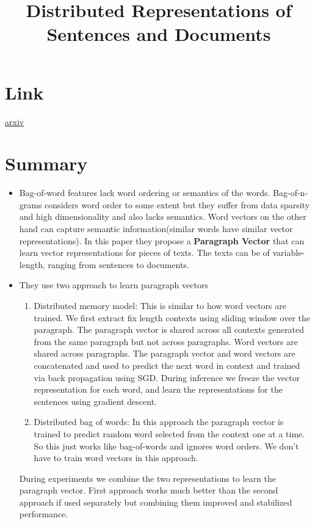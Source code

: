 \documentclass{article}
\title{Distributed Representations of Sentences and Documents}
\author{}
\date{}
\begin{document}
\maketitle

\section*{Link}
\href{https://arxiv.org/abs/1405.4053}{arxiv} 

\section*{Summary}
\begin{itemize}
    \item Bag-of-word features lack word ordering or semantics of the words. Bag-of-n-grams considers word order to some extent but they suffer from data sparsity and high dimensionality and also lacks semantics. Word vectors on the other hand can capture semantic information(similar words have similar vector representations). In this paper they propose a \textbf{Paragraph Vector} that can learn vector representations for pieces of texts. The texts can be of variable-length, ranging from sentences to documents.
    \item They use two approach to learn paragraph vectors
    \begin{enumerate}
        \item Distributed memory model: This is similar to how word vectors are trained. We first extract fix length contexts using sliding window over the paragraph. The paragraph vector is shared across all contexts generated from the same paragraph but not across paragraphs. Word vectors are shared across paragraphs. The paragraph vector and word vectors are concatenated and used to predict the next word in context and trained via back propagation using SGD. During inference we freeze the vector representation for each word, and learn the representations for the sentences using gradient descent.
        \item Distributed bag of words: In this approach the paragraph vector is trained to predict random word selected from the context one at a time. So this just works like bag-of-words and ignores word orders. We don't have to train word vectors in this approach. 
    \end{enumerate}
    During experiments we combine the two representations to learn the paragraph vector. First approach works much better than the second approach if used separately but combining them improved and stabilized performance. 

\end{itemize}
\end{document}
